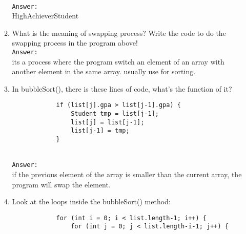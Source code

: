 \documentclass[12pt,titlepage]{article}
\begin{document}
\begin{enumerate}
\begin{enumerate}[label=\arabic*.]
        \mbox{}\\
        \texttt{Answer: }
        \mbox{}\\
        HighAchieverStudent
        \item What is the meaning of swapping process? Write the code to do the swapping process in the program above!
        \mbox{}\\
        \texttt{Answer: }
        \mbox{}\\
        its a process where the program switch an element of an array with another element in the same array. usually use for sorting.
        \item In bubbleSort(), there is these lines of code, what’s the function of it?
        \begin{verbatim}
            if (list[j].gpa > list[j-1].gpa) {
                Student tmp = list[j-1];
                list[j] = list[j-1];
                list[j-1] = tmp;
            } 
        \end{verbatim}
        \mbox{}\\
        \texttt{Answer: }
        \mbox{}\\
        if the previous element of the array is smaller than the current array, the program will swap the element.
        \item Look at the loops inside the bubbleSort() method:
        \begin{verbatim}
            for (int i = 0; i < list.length-1; i++) {
                for (int j = 0; j < list.length-i-1; j++) {


\end{verbatim}
\end{enumerate}
\end{enumerate}
\end{document}

